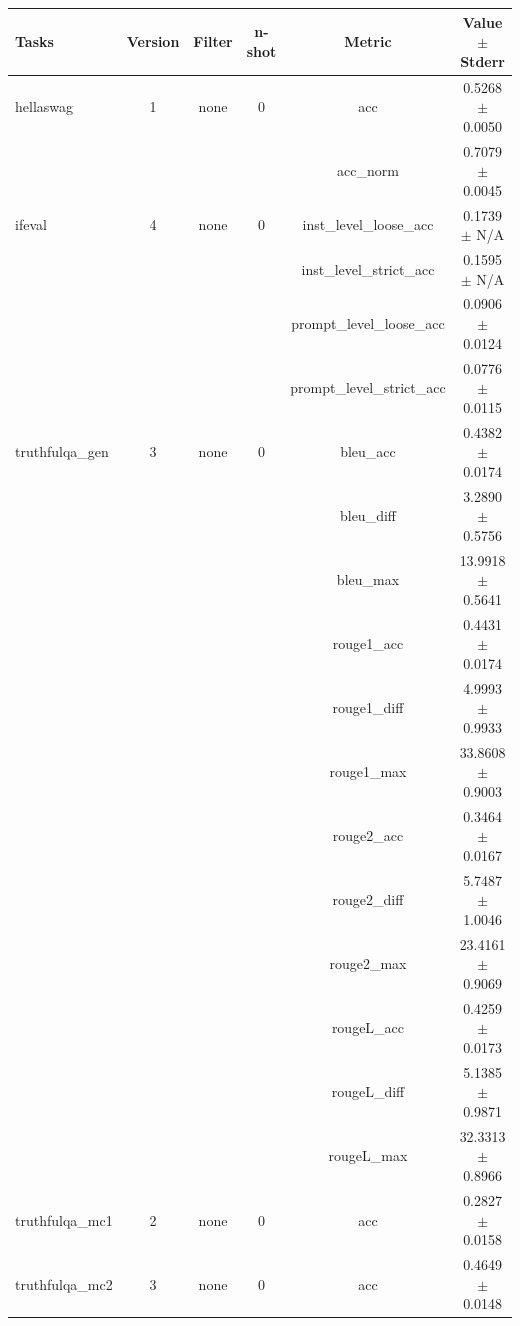 \documentclass{ifacconf}
\begin{document}
\begin{strip}
\begin{minipage}{\textwidth}
    \begin{table}[H]
    \centering
    \begin{tabular}{|l|c|c|c|c|c|}
    \hline
    \textbf{Tasks} & \textbf{Version} & \textbf{Filter} & \textbf{n-shot} & \textbf{Metric} & \textbf{Value} $\pm$ \textbf{Stderr} \\ \hline
    hellaswag & 1 & none & 0 & acc & 0.5268 $\pm$ 0.0050 \\ \hline
    & & & & acc\_norm & 0.7079 $\pm$ 0.0045 \\ \hline
    ifeval & 4 & none & 0 & inst\_level\_loose\_acc & 0.1739 $\pm$ N/A \\ \hline
    & & & & inst\_level\_strict\_acc & 0.1595 $\pm$ N/A \\ \hline
    & & & & prompt\_level\_loose\_acc & 0.0906 $\pm$ 0.0124 \\ \hline
    & & & & prompt\_level\_strict\_acc & 0.0776 $\pm$ 0.0115 \\ \hline
    truthfulqa\_gen & 3 & none & 0 & bleu\_acc & 0.4382 $\pm$ 0.0174 \\ \hline
    & & & & bleu\_diff & 3.2890 $\pm$ 0.5756 \\ \hline
    & & & & bleu\_max & 13.9918 $\pm$ 0.5641 \\ \hline
    & & & & rouge1\_acc & 0.4431 $\pm$ 0.0174 \\ \hline
    & & & & rouge1\_diff & 4.9993 $\pm$ 0.9933 \\ \hline
    & & & & rouge1\_max & 33.8608 $\pm$ 0.9003 \\ \hline
    & & & & rouge2\_acc & 0.3464 $\pm$ 0.0167 \\ \hline
    & & & & rouge2\_diff & 5.7487 $\pm$ 1.0046 \\ \hline
    & & & & rouge2\_max & 23.4161 $\pm$ 0.9069 \\ \hline
    & & & & rougeL\_acc & 0.4259 $\pm$ 0.0173 \\ \hline
    & & & & rougeL\_diff & 5.1385 $\pm$ 0.9871 \\ \hline
    & & & & rougeL\_max & 32.3313 $\pm$ 0.8966 \\ \hline
    truthfulqa\_mc1 & 2 & none & 0 & acc & 0.2827 $\pm$ 0.0158 \\ \hline
    truthfulqa\_mc2 & 3 & none & 0 & acc & 0.4649 $\pm$ 0.0148 \\ \hline
    \end{tabular}
    \label{tab:llama31_q4km}
    \end{table}


\end{minipage}
\end{strip}
\end{document}
